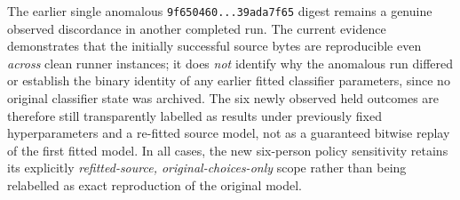 The earlier single anomalous
\texttt{9f650460...39ada7f65} digest remains
a genuine observed discordance in another
completed run. The current evidence
demonstrates that the initially successful
source bytes are reproducible even
\emph{across} clean runner instances;
it does \emph{not} identify why the
anomalous run differed or establish
the binary identity of any earlier
fitted classifier parameters, since no
original classifier state was archived.
The six newly observed held outcomes
are therefore still transparently
labelled as results under previously
fixed hyperparameters and a re-fitted
source model, not as a guaranteed
bitwise replay of the first fitted model.
In all cases, the new six-person
policy sensitivity retains its explicitly
\emph{refitted-source, original-choices-only}
scope rather than being relabelled as
exact reproduction of the original model.
